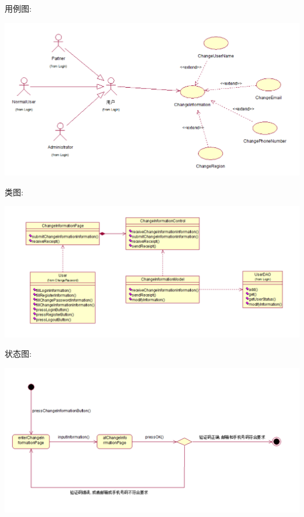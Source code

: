 \documentclass[11pt]{article}
\begin{document}
			用例图: 
			\begin{center}
			\includegraphics[scale=0.42]{修改用户信息_用例图.png}
			\end{center}

			类图: 
			\begin{center}
			\includegraphics[scale=0.42]{修改用户信息_类图.png}
			\end{center}

			状态图: 
			\begin{center}
			\includegraphics[scale=0.42]{修改用户信息_状态图.png}
			\end{center}
\end{document}
